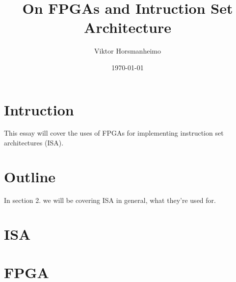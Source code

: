 \documentclass{paper}
\title{On FPGAs and Intruction Set Architecture}
\author{Viktor Horsmanheimo}
\date{\today}
\begin{document}
\maketitle

\section{Intruction}

This essay will cover the uses of FPGAs for implementing instruction set architectures
(ISA).



\section{Outline}

In section 2. we will be covering ISA in general, what they're used for.

\section{ISA}

\section{FPGA}

\printbibliography
\end{document}

